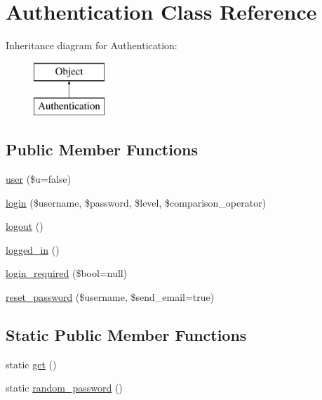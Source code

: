 \hypertarget{class_authentication}{
\section{Authentication Class Reference}
\label{class_authentication}
}
Inheritance diagram for Authentication:\begin{figure}[H]
\begin{center}
\leavevmode
\includegraphics[height=2.000000cm]{class_authentication}
\end{center}
\end{figure}
\subsection*{Public Member Functions}
\begin{DoxyCompactItemize}
\item 
\hyperlink{class_authentication_a41a0b74b283d108f8323ee8f714431be}{user} (\$u=false)
\item 
\hyperlink{class_authentication_aba4bdf122812c7e480f9f082642064e1}{login} (\$username, \$password, \$level, \$comparison\_\-operator)
\item 
\hyperlink{class_authentication_a082405d89acd6835c3a7c7a08a7adbab}{logout} ()
\item 
\hyperlink{class_authentication_ad488b2fc379939d02890e0dc0533d1a4}{logged\_\-in} ()
\item 
\hyperlink{class_authentication_ad4cd87cb1a3b9b5adec7dff9a3e3e246}{login\_\-required} (\$bool=null)
\item 
\hyperlink{class_authentication_ab7b9c251262cc35619f824845818d844}{reset\_\-password} (\$username, \$send\_\-email=true)
\end{DoxyCompactItemize}
\subsection*{Static Public Member Functions}
\begin{DoxyCompactItemize}
\item 
static \hyperlink{class_authentication_a5ba61361bf0695a285bbaefefc427191}{get} ()
\item 
static \hyperlink{class_authentication_a46f9c5c93ad36418847b5a62e7204ebb}{random\_\-password} ()
\end{DoxyCompactItemize}
